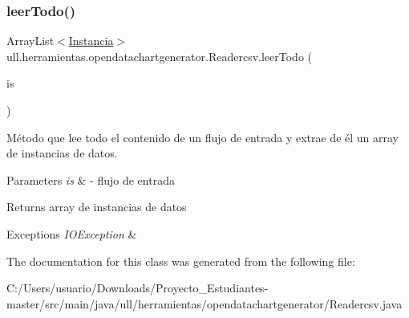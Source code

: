 \subsubsection{\texorpdfstring{leer\+Todo()}{leerTodo()}}
{\footnotesize\ttfamily Array\+List$<$\mbox{\hyperlink{classull_1_1herramientas_1_1opendatachartgenerator_1_1_instancia}{Instancia}}$>$ ull.\+herramientas.\+opendatachartgenerator.\+Readercsv.\+leer\+Todo (\begin{DoxyParamCaption}\item[{Input\+Stream}]{is }\end{DoxyParamCaption})}



Método que lee todo el contenido de un flujo de entrada y extrae de él un array de instancias de datos. 


\begin{DoxyParams}{Parameters}
{\em is} & -\/ flujo de entrada \\
\hline
\end{DoxyParams}
\begin{DoxyReturn}{Returns}
array de instancias de datos 
\end{DoxyReturn}

\begin{DoxyExceptions}{Exceptions}
{\em I\+O\+Exception} & \\
\hline
\end{DoxyExceptions}


The documentation for this class was generated from the following file\+:\begin{DoxyCompactItemize}
\item 
C\+:/\+Users/usuario/\+Downloads/\+Proyecto\+\_\+\+Estudiantes-\/master/src/main/java/ull/herramientas/opendatachartgenerator/Readercsv.\+java\end{DoxyCompactItemize}
